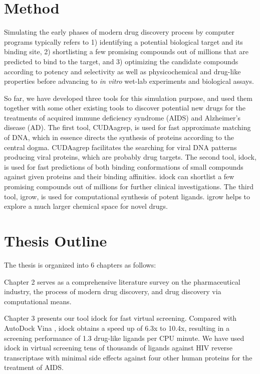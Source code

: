 \section{Method}

Simulating the early phases of modern drug discovery process by computer programs typically refers to 1) identifying a potential biological target and its binding site, 2) shortlisting a few promising compounds out of millions that are predicted to bind to the target, and 3) optimizing the candidate compounds according to potency and selectivity as well as physicochemical and drug-like properties before advancing to \textit{in vitro} wet-lab experiments and biological assays.

So far, we have developed three tools for this simulation purpose, and used them together with some other existing tools to discover potential new drugs for the treatments of acquired immune deficiency syndrome (AIDS) and Alzheimer's disease (AD). The first tool, CUDAagrep, is used for fast approximate matching of DNA, which in essence directs the synthesis of proteins according to the central dogma. CUDAagrep facilitates the searching for viral DNA patterns producing viral proteins, which are probably drug targets. The second tool, idock, is used for fast predictions of both binding conformations of small compounds against given proteins and their binding affinities. idock can shortlist a few promising compounds out of millions for further clinical investigations. The third tool, igrow, is used for computational synthesis of potent ligands. igrow helps to explore a much larger chemical space for novel drugs.

\section{Thesis Outline}

The thesis is organized into 6 chapters as follows:

Chapter 2 serves as a comprehensive literature survey on the pharmaceutical industry, the process of modern drug discovery, and drug discovery via computational means.

Chapter 3 presents our tool idock for fast virtual screening. Compared with AutoDock Vina \citep{595}, idock obtains a speed up of 6.3x to 10.4x, resulting in a screening performance of 1.3 drug-like ligands per CPU minute. We have used idock in virtual screening tens of thousands of ligands against HIV reverse transcriptase with minimal side effects against four other human proteins for the treatment of AIDS.


